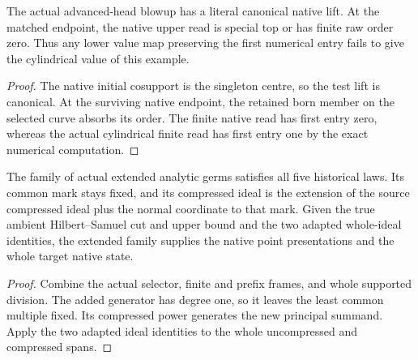 \begin{theorem}
\label{hir:g1-joint-example-actual-native-value-obstruction}
\leanok
The actual advanced-head blowup has a literal canonical
native lift. At the matched endpoint, the native upper
read is special top or has finite raw order zero. Thus
any lower value map preserving the first numerical entry
fails to give the cylindrical value of this example.
\end{theorem}
\begin{proof}
The native initial cosupport is the singleton centre,
so the test lift is canonical. At the surviving native
endpoint, the retained born member on the selected curve
absorbs its order. The finite native read has first entry
zero, whereas the actual cylindrical finite read has first
entry one by the exact numerical computation.
\end{proof}

\begin{theorem}
\label{hir:g1-closed-normal-weighted-presentation}
\leanok
The family of actual extended analytic germs satisfies all
five historical laws. Its common mark stays fixed, and its
compressed ideal is the extension of the source compressed
ideal plus the normal coordinate to that mark. Given the
true ambient Hilbert--Samuel cut and upper bound and the
two adapted whole-ideal identities, the extended family
supplies the native point presentations and the whole
target native state.
\end{theorem}
\begin{proof}
Combine the actual selector, finite and prefix frames, and
whole supported division. The added generator has degree
one, so it leaves the least common multiple fixed. Its
compressed power generates the new principal summand.
Apply the two adapted ideal identities to the whole
uncompressed and compressed spans.
\end{proof}

